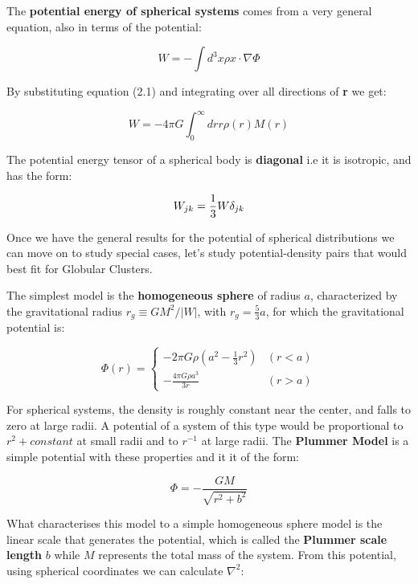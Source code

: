 The \textbf{potential energy of spherical systems}  comes from a very general equation, also in terms of the potential:

\begin{equation}
W=-\int d^{3}x\rho x\cdot\nabla\Phi
\end{equation}

By substituting equation (2.1) and integrating over all directions of \textbf{r} we get:

\begin{equation}
W=-4\pi G\int_{0}^{\infty}drr\rho(r)M(r)
\end{equation}

The potential energy tensor of a spherical body is \textbf{diagonal} i.e it is isotropic, and has the form:

\begin{equation}
W_{jk}={{1}\over{3}}W\delta_{jk}
\end{equation}

Once we have the general results for the potential of spherical distributions we can move on to study special cases, let's study potential-density pairs that would best fit for Globular Clusters.

The simplest model is the \textbf{homogeneous sphere} of radius $a$, characterized by the gravitational radius $r_{g}\equiv GM^{2}/|W|$, with $r_{g}=\frac{5}{3}a$, for which the gravitational potential is:

\begin{equation}
\Phi(r) = \left\lbrace
\begin{array}{ll}
-2\pi G\rho\left(a^{2}-\frac{1}{3}r^{2}\right) & (r<a)\\
-\frac{4\pi G\rho a^{3}}{3r} & (r>a)
\end{array}
\right.
\end{equation} 

For spherical systems, the density is roughly constant near the center, and falls to zero at large radii. A potential of a system of this type would be proportional to $r^{2} + constant$ at small radii and to $r^{-1}$ at large radii. The \textbf{Plummer Model} is a simple potential with these properties and it it of the form:

\begin{equation}
\Phi=-\frac{GM}{\sqrt{r^{2}+b^{2}}}
\end{equation}

What characterises this model to a simple homogeneous sphere model is the linear scale that generates the potential, which is called the \textbf{Plummer scale length} $b$ while $M$ represents the total mass of the system. From this potential, using spherical coordinates we can calculate $\nabla^{2}$:

